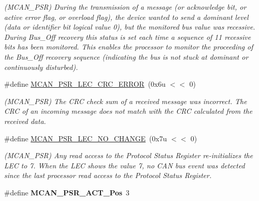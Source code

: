 \begin{DoxyCompactItemize}
\begin{DoxyCompactList}\small\item\em (M\+C\+A\+N\+\_\+\+P\+SR) During the transmission of a message (or acknowledge bit, or active error flag, or overload flag), the device wanted to send a dominant level (data or identifier bit logical value \textquotesingle{}0\textquotesingle{}), but the monitored bus value was recessive. During Bus\+\_\+\+Off recovery this status is set each time a sequence of 11 recessive bits has been monitored. This enables the processor to monitor the proceeding of the Bus\+\_\+\+Off recovery sequence (indicating the bus is not stuck at dominant or continuously disturbed). \end{DoxyCompactList}\item 
\mbox{\label{group__SAMV71__MCAN_gad5b12fc19edb796d257aa9830780eac1}} 
\#define \mbox{\hyperlink{group__SAMV71__MCAN_gad5b12fc19edb796d257aa9830780eac1}{M\+C\+A\+N\+\_\+\+P\+S\+R\+\_\+\+L\+E\+C\+\_\+\+C\+R\+C\+\_\+\+E\+R\+R\+OR}}~(0x6u $<$$<$ 0)
\begin{DoxyCompactList}\small\item\em (M\+C\+A\+N\+\_\+\+P\+SR) The C\+RC check sum of a received message was incorrect. The C\+RC of an incoming message does not match with the C\+RC calculated from the received data. \end{DoxyCompactList}\item 
\mbox{\label{group__SAMV71__MCAN_ga889f4772e837e791251e88e478772bd2}} 
\#define \mbox{\hyperlink{group__SAMV71__MCAN_ga889f4772e837e791251e88e478772bd2}{M\+C\+A\+N\+\_\+\+P\+S\+R\+\_\+\+L\+E\+C\+\_\+\+N\+O\+\_\+\+C\+H\+A\+N\+GE}}~(0x7u $<$$<$ 0)
\begin{DoxyCompactList}\small\item\em (M\+C\+A\+N\+\_\+\+P\+SR) Any read access to the Protocol Status Register re-\/initializes the L\+EC to \textquotesingle{}7\textquotesingle{}. When the L\+EC shows the value \textquotesingle{}7\textquotesingle{}, no C\+AN bus event was detected since the last processor read access to the Protocol Status Register. \end{DoxyCompactList}\item 
\mbox{\label{group__SAMV71__MCAN_ga778c3cefc5db7485ff59fcda5fafc1c3}} 
\#define {\bfseries M\+C\+A\+N\+\_\+\+P\+S\+R\+\_\+\+A\+C\+T\+\_\+\+Pos}~3
\item 

\end{DoxyCompactItemize}
